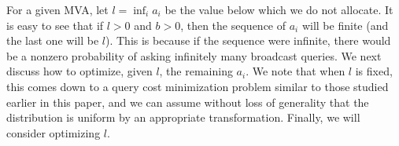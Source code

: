 




For a given MVA, let $l = \inf_i a_i$ be the value below which we do not
allocate.  It is easy to see that if $l>0$ and $b>0$, then the sequence of
$a_i$ will be finite (and the last one will be $l$). This is because if the
sequence were infinite, there would be a nonzero probability of asking
infinitely many broadcast queries.
We next discuss how to optimize, given $l$, the remaining $a_i$.  We note
that when $l$ is fixed, this comes down to a query cost minimization problem 
similar to those studied earlier in this paper, and we can assume without
loss of generality that the distribution is uniform by an appropriate
transformation. Finally, we will consider optimizing $l$.



